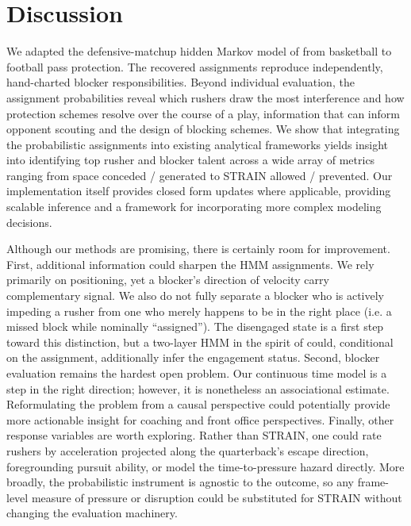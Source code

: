 \documentclass[USenglish]{article}
\let\OldSubsection\subsection
\renewcommand{\subsection}{\FloatBarrier\OldSubsection}
\theoremstyle{dgthm}
\theoremstyle{dgdef}
\begin{document}
\section{Discussion} \label{discussion}
We adapted the defensive-matchup hidden Markov model of \cite{franks2015characterizing} from basketball to football pass protection. The recovered assignments reproduce independently, hand-charted blocker responsibilities. Beyond individual evaluation, the assignment probabilities reveal which rushers draw the most interference and how protection schemes resolve over the course of a play, information that can inform opponent scouting and the design of blocking schemes. We show that integrating the probabilistic assignments into existing analytical frameworks yields insight into identifying top rusher and blocker talent across a wide array of metrics ranging from space conceded / generated to STRAIN allowed / prevented. Our implementation itself provides closed form updates where applicable, providing scalable inference and a framework for incorporating more complex modeling decisions. 


Although our methods are promising, there is certainly room for improvement. First, additional information could sharpen the HMM assignments. We rely primarily on positioning, yet a blocker's direction of velocity carry complementary signal. We also do not fully separate a blocker who is actively impeding a rusher from one who merely happens to be in the right place (i.e. a missed block while nominally ``assigned''). The disengaged state is a first step toward this distinction, but a two-layer HMM in the spirit of \cite{twolayerhmm} could, conditional on the assignment, additionally infer the engagement status. Second, blocker evaluation remains the hardest open problem. Our continuous time model is a step in the right direction; however, it is nonetheless an associational estimate. Reformulating the problem from a causal perspective could potentially provide more actionable insight for coaching and front office perspectives. Finally, other response variables are worth exploring. Rather than STRAIN, one could rate rushers by acceleration projected along the quarterback's escape direction, foregrounding pursuit ability, or model the time-to-pressure hazard directly. More broadly, the probabilistic instrument is agnostic to the outcome, so any frame-level measure of pressure or disruption could be substituted for STRAIN without changing the evaluation machinery.
\end{document}
